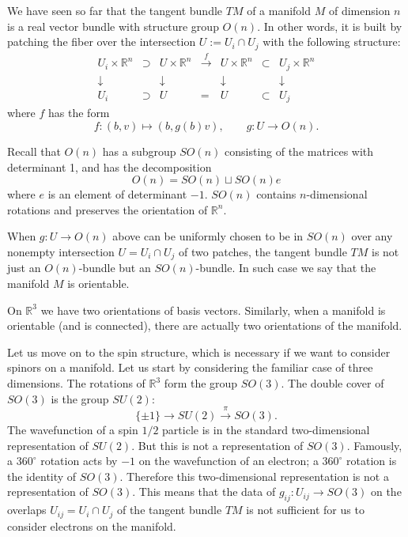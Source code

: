 \documentclass[12pt]{article}
\numberwithin{equation}{section}
\numberwithin{figure}{section}
\theoremstyle{remark}
\def\bR{\mathbb{R}}
\begin{document}
We have seen so far that the tangent bundle $TM$ of a manifold $M$ of dimension $n$
is a real vector bundle with structure group $O(n)$.
In other words, it is built by patching the fiber over the intersection $U:=U_i\cap U_j$
with the following structure: 
\begin{equation}
  \begin{array}{cccccccc}
    U_i \times \bR^n  &\supset& U \times \bR^n  & \xrightarrow{f } & 
    U \times \bR^n  & \subset & U_j\times \bR^n  \\
    \downarrow & & \downarrow & & \downarrow & & \downarrow \\
    U_i & \supset & U  & = & U  & \subset & U_j
  \end{array}
\end{equation}
where $f $ has the form \begin{equation}
   f : (b,v) \mapsto (b, g(b) v), \qquad g: U\to O(n).
\end{equation} 

Recall that $O(n)$ has a subgroup $SO(n)$ consisting of the matrices with determinant 1,
and has the decomposition \begin{equation}
O(n) = SO(n) \sqcup SO(n)e
\end{equation} where $e$ is an element of determinant $-1$.
$SO(n)$ contains $n$-dimensional rotations and preserves the orientation of $\bR^n$.

\begin{definition}  
When $g:U\to O(n)$ above can be uniformly chosen to be in $SO(n)$
over any nonempty intersection $U=U_i\cap U_j$ of two patches,
the tangent bundle $TM$ is not just an $O(n)$-bundle but an $SO(n)$-bundle.
In such case we say that the manifold $M$ is orientable.
\end{definition}

On $\bR^3$ we have two orientations of basis vectors.
Similarly, when a manifold is orientable (and is connected),
there are actually two orientations of the manifold.

Let us move on to the spin structure,
which is necessary if we want to consider spinors on a manifold.
Let us start by considering the familiar case of three dimensions.
The rotations of $\bR^3$ form the group $SO(3)$.
The double cover of $SO(3)$ is the group $SU(2)$: 
\begin{equation}
  \{\pm1\}\to SU(2) \xrightarrow{\pi} SO(3).
\end{equation}
The wavefunction of a spin $1/2$ particle is in the standard two-dimensional representation of $SU(2)$.
But this is not a representation of $SO(3)$.
Famously, a $360^\circ$ rotation acts by $-1$ on the wavefunction of an electron;
a $360^\circ$ rotation is the identity of $SO(3)$.
Therefore this two-dimensional representation is not a representation of $SO(3)$.
This means that the data of $g_{ij}:U_{ij}\to SO(3)$ 
on the overlaps $U_{ij}=U_i\cap U_j$ of the tangent bundle $TM$ 
is not sufficient for us to consider electrons on the manifold.
\end{document}
